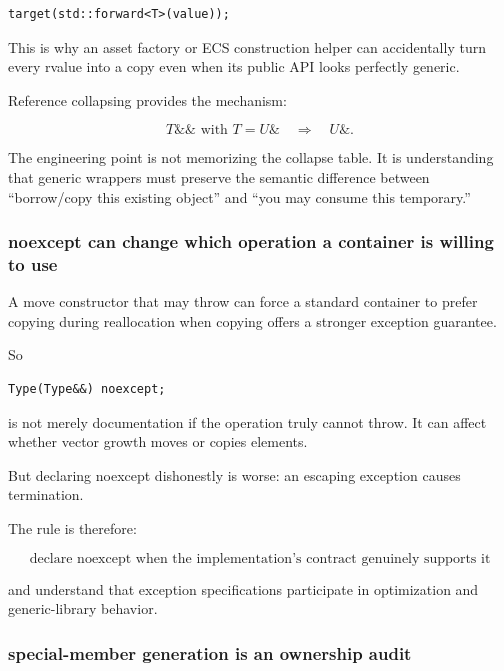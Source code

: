 \begin{verbatim}
target(std::forward<T>(value));
\end{verbatim}

This is why an asset factory or ECS construction helper can accidentally turn every rvalue into a copy even when its public API looks perfectly generic.

Reference collapsing provides the mechanism:

\[
T\&\& \text{ with } T=U\&
\quad\Rightarrow\quad
U\&.
\]

The engineering point is not memorizing the collapse table. It is understanding that generic wrappers must preserve the semantic difference between ``borrow/copy this existing object'' and ``you may consume this temporary.''

\subsubsection{noexcept can change which operation a container is willing to use}\label{01-foundations-i-ch005-noexcept-can-change-which-operation-a-container-is-willing-to-use}

A move constructor that may throw can force a standard container to prefer copying during reallocation when copying offers a stronger exception guarantee.

So

\begin{verbatim}
Type(Type&&) noexcept;
\end{verbatim}

is not merely documentation if the operation truly cannot throw. It can affect whether vector growth moves or copies elements.

But declaring noexcept dishonestly is worse: an escaping exception causes termination.

The rule is therefore:

\[
\boxed{
\text{declare noexcept when the implementation's contract genuinely supports it}
}
\]

and understand that exception specifications participate in optimization and generic-library behavior.

\subsubsection{special-member generation is an ownership audit}\label{01-foundations-i-ch005-special-member-generation-is-an-ownership-audit}

